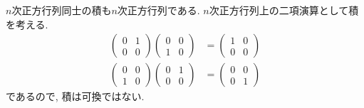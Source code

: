 \begin{nonexample}
  $n$次正方行列同士の積も$n$次正方行列である.
  $n$次正方行列上の二項演算として積を考える.
  \begin{align*}
    \begin{pmatrix}
      0&1\\0&0
    \end{pmatrix}
    \begin{pmatrix}
      0&0\\1&0
    \end{pmatrix}
    &=
    \begin{pmatrix}
      1&0\\0&0
    \end{pmatrix}
    \\
    \begin{pmatrix}
      0&0\\1&0
    \end{pmatrix}
    \begin{pmatrix}
      0&1\\0&0
    \end{pmatrix}
    &=
    \begin{pmatrix}
      0&0\\0&1
    \end{pmatrix}
  \end{align*}
  であるので,
  積は可換ではない.
\end{nonexample}

